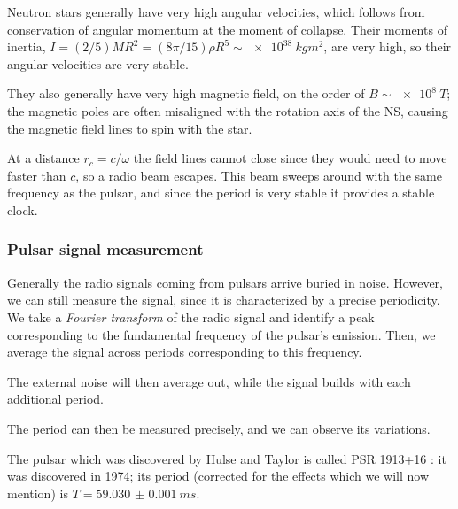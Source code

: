 \documentclass[main.tex]{subfiles}
\begin{document}
Neutron stars generally have very high angular velocities, which follows from conservation of angular momentum at the moment of collapse. 
Their moments of inertia, \(I = (2/5) M R^2 = (8 \pi /15) \rho R^{5} \sim \SI{e38}{kg m^2} \), are very high, so their angular velocities are very stable.

They also generally have very high magnetic field, on the order of \(B \sim \SI{e8}{T}\); the magnetic poles are often misaligned with the rotation axis of the NS, causing the magnetic field lines to spin with the star.



At a distance \(r_c = c/\omega \) the field lines cannot close since they would need to move faster than \(c\), so a radio beam escapes. 
This beam sweeps around with the same frequency as the pulsar, and since the period is very stable it provides a stable clock. 

\subsubsection{Pulsar signal measurement}


Generally the radio signals coming from pulsars arrive buried in noise. 
However, we can still measure the signal, since it is characterized by a precise periodicity. 
We take a \emph{Fourier transform} of the radio signal and identify a peak corresponding to the fundamental frequency of the pulsar's emission. 
Then, we average the signal across periods corresponding to this frequency. 

The external noise will then average out, while the signal builds with each additional period.


The period can then be measured precisely, and we can observe its variations. 

The pulsar which was discovered by Hulse and Taylor is called PSR 1913+16 \cite[]{hulseDiscoveryPulsarBinary1975}: it was discovered in 1974; its period (corrected for the effects which we will now mention) is \(T = \SI{59.030(1)}{ms}\).
\end{document}
